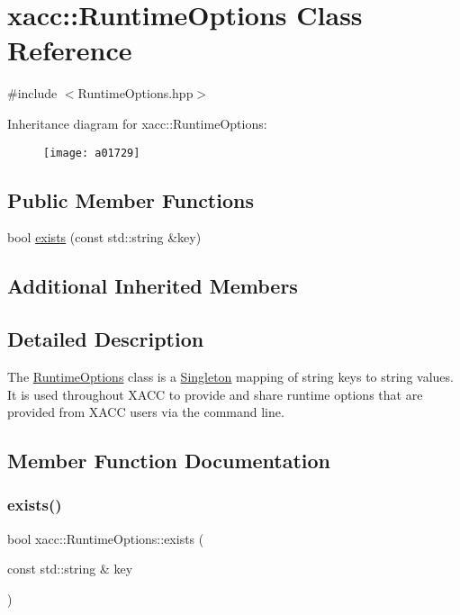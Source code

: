 \hypertarget{a01729}{}\section{xacc\+:\+:Runtime\+Options Class Reference}
\label{a01729}


{\ttfamily \#include $<$Runtime\+Options.\+hpp$>$}

Inheritance diagram for xacc\+:\+:Runtime\+Options\+:\begin{figure}[H]
\begin{center}
\leavevmode
\texttt{[image: a01729]}
\end{center}
\end{figure}
\subsection*{Public Member Functions}
\begin{DoxyCompactItemize}
\item 
bool \hyperlink{a01729_a3603aecb87461efedd0fabbef966c80c}{exists} (const std\+::string \&key)
\end{DoxyCompactItemize}
\subsection*{Additional Inherited Members}


\subsection{Detailed Description}
The \hyperlink{a01729}{Runtime\+Options} class is a \hyperlink{a01733}{Singleton} mapping of string keys to string values. It is used throughout X\+A\+CC to provide and share runtime options that are provided from X\+A\+CC users via the command line. 

\subsection{Member Function Documentation}
\mbox{\label{a01729_a3603aecb87461efedd0fabbef966c80c}} 
\subsubsection{\texorpdfstring{exists()}{exists()}}
{\footnotesize\ttfamily bool xacc\+::\+Runtime\+Options\+::exists (\begin{DoxyParamCaption}\item[{const std\+::string \&}]{key }\end{DoxyParamCaption})\hspace{0.3cm}{\ttfamily [inline]}}

